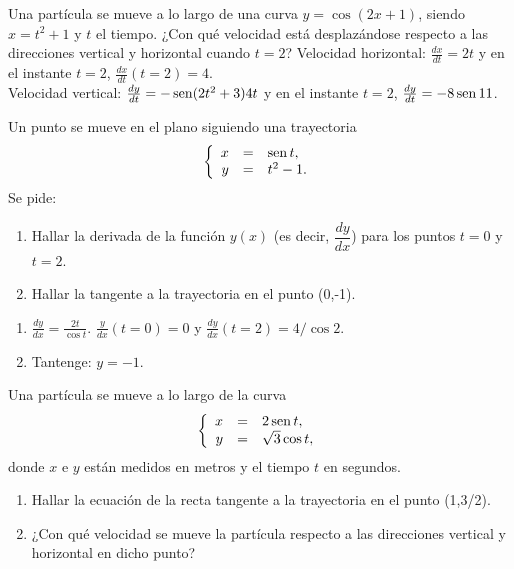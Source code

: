 
{Una partícula se mueve a lo largo de una curva $y=\cos(2x+1)$, siendo $x=t^2+1$ y $t$ el tiempo. ¿Con qué velocidad está desplazándose respecto a las direcciones vertical y horizontal cuando $t=2$?
}
{Velocidad horizontal: $\frac{dx}{dt} = 2t$ y en el instante $t=2$, $\frac{dx}{dt}(t=2)=4$.\\
Velocidad vertical: $\frac{dy}{dt}=-\operatorname{sen}(2t^2+3)4t$ y en el instante $t=2$, $\frac{dy}{dt}=-8\operatorname{sen} 11$. 
}
{
}


{Un punto se mueve en el plano siguiendo una trayectoria
\[ \left\{
\begin{array}{rcl}
    x & = & \operatorname{sen} t,\\
    y & = & t^2-1.
\end{array} \right.\]
Se pide:
\begin{enumerate}
    \item  Hallar la derivada de la función $y(x)$ (es decir,
    $\dfrac{dy}{dx}$) para los puntos $t=0$ y $t=2$.

    \item  Hallar la tangente a la trayectoria en el punto (0,-1).
\end{enumerate}
}
{\begin{enumerate}
\item $\frac{dy}{dx} = \frac{2t}{\cos t}$. $\frac{y}{dx}(t=0) = 0$ y $\frac{dy}{dx}(t=2) = 4/\cos 2$.
\item Tantenge: $y=-1$. 
\end{enumerate}
}
{
}


{Una partícula se mueve a lo largo de la curva
\[ \left\{
 \begin{array}{rcl}
   x & = & 2\operatorname{sen} t,  \\
   y & = & \sqrt{3}\cos t,
 \end{array}\right.
  \]
donde $x$ e $y$ están medidos en metros y el tiempo $t$ en
segundos.
\begin{enumerate}
   \item  Hallar la ecuación de la recta tangente a la trayectoria
   en el punto (1,3/2).

   \item  ¿Con qué velocidad se mueve la partícula respecto a
   las direcciones vertical y horizontal en dicho punto?
\end{enumerate}
}


